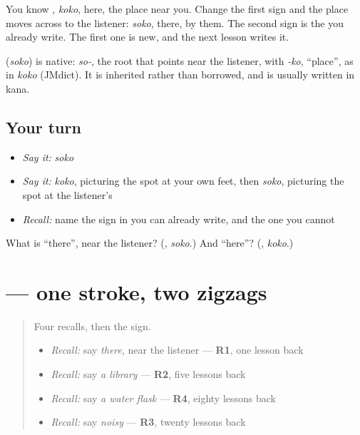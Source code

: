 You know \textbf{}, \emph{koko}, here, the place near you. Change the first sign and the place moves across to the listener: \emph{soko}, there, by them. The second sign is the \textbf{} you already write. The first one is new, and the next lesson writes it.

\begin{cousinweb}
\textbf{} (\emph{soko}) is native: \emph{so-}, the root that points near the listener, with \emph{-ko}, \textquotedblleft{}place\textquotedblright{}, as in \emph{koko} (JMdict). It is inherited rather than borrowed, and is usually written in kana.
\end{cousinweb}

\subsection*{Your turn}
\begin{itemize}
\raggedright
  \item \emph{Say it:} \emph{soko}
  \item \emph{Say it:} \emph{koko}, picturing the spot at your own feet, then \emph{soko}, picturing the spot at the listener's
  \item \emph{Recall:} name the sign in \textbf{} you can already write, and the one you cannot
\end{itemize}

\begin{tcolorbox}[breakable,colback=teal!4,colframe=teal!35!black,title={Before you move on}]
What is \textquotedblleft{}there\textquotedblright{}, near the listener? (\textbf{}, \emph{soko}.) And \textquotedblleft{}here\textquotedblright{}? (\textbf{}, \emph{koko}.)
\end{tcolorbox}
\section[\texorpdfstring{\ja{そ} (so)}{そ (so)}]{ — one stroke, two zigzags}

\label{lesson:JA-W132-so}



\begin{quote}
Four recalls, then the sign.

\begin{itemize}
\raggedright
  \item \emph{Recall:} say \emph{there}, near the listener — \textbf{R1}, one lesson back
  \item \emph{Recall:} say \emph{a library} — \textbf{R2}, five lessons back
  \item \emph{Recall:} say \emph{a water flask} — \textbf{R4}, eighty lessons back
  \item \emph{Recall:} say \emph{noisy} — \textbf{R3}, twenty lessons back
\end{itemize}
\end{quote}

